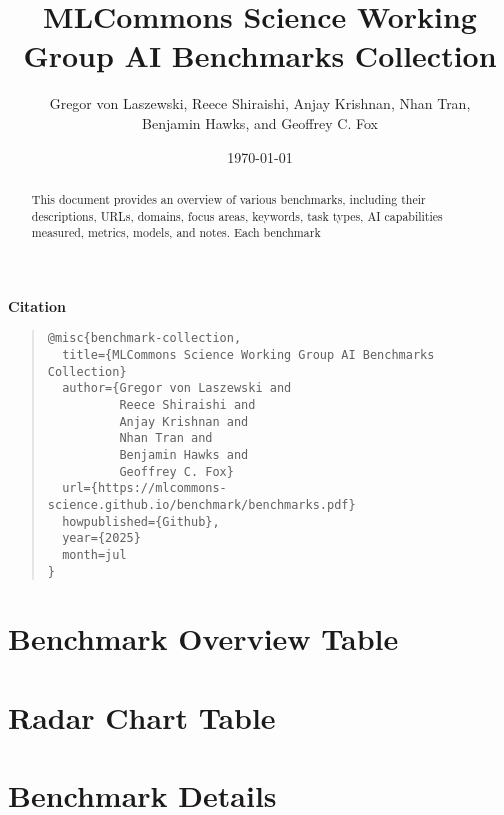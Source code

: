 \documentclass[10pt]{article}
\begin{document}
\sloppy
\author{Gregor von Laszewski,
          Reece Shiraishi, 
          Anjay Krishnan, 
          Nhan Tran, \\
          Benjamin Hawks, and 
          Geoffrey C. Fox}

\date{\today}
\title{MLCommons Science Working Group AI Benchmarks Collection}
\maketitle

\begin {abstract}
This document provides an overview of various benchmarks, including their descriptions, URLs, domains, focus areas, keywords, task types, AI capabilities measured, metrics, models, and notes. Each benchmark
\end{abstract}

\vfill 

{\centering \bfseries Citation \par}

\begin{quote}
\begin{verbatim}
@misc{benchmark-collection,
  title={MLCommons Science Working Group AI Benchmarks Collection}
  author={Gregor von Laszewski and 
          Reece Shiraishi and 
          Anjay Krishnan and 
          Nhan Tran and 
          Benjamin Hawks and 
          Geoffrey C. Fox}
  url={https://mlcommons-science.github.io/benchmark/benchmarks.pdf}
  howpublished={Github},
  year={2025}
  month=jul
}
\end{verbatim}
\end{quote}
\clearpage
\tableofcontents
\clearpage


\section{Benchmark Overview Table}



\clearpage


\section{Radar Chart Table}



\clearpage


\section{Benchmark Details}
\end{document}
